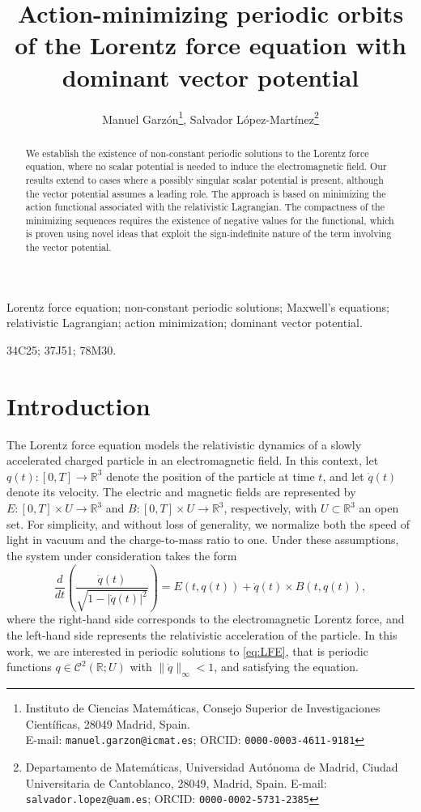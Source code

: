 \documentclass{article}
\title{Action-minimizing periodic orbits of the Lorentz force equation with dominant vector potential}
\author{ Manuel Garz\'on\footnote{Instituto de Ciencias Matemáticas, Consejo Superior de Investigaciones Científicas, 28049 Madrid, Spain. \\E-mail: {\tt manuel.garzon@icmat.es}; ORCID: {\tt 0000-0003-4611-9181}}, Salvador L\'opez-Mart\'inez\footnote{Departamento de Matem\'aticas, Universidad Aut\'onoma de Madrid, Ciudad Universitaria de Cantoblanco, 28049, Madrid, Spain. 
		E-mail: {\tt salvador.lopez@uam.es}; ORCID: {\tt 0000-0002-5731-2385}}}
\newcommand{\boC}{\mathcal{C}}
\newcommand{\R}{\mathbb{R}}
\newcommand{\dq}{\dot{q}}
\theoremstyle{definition}
\begin{document}
\maketitle

\medskip
	
\begin{abstract}
We establish the existence of non-constant periodic solutions to the Lorentz force equation, where no scalar potential is needed to induce the electromagnetic field. Our results extend to cases where a possibly singular scalar potential is present, although the vector potential assumes a leading role. The approach is based on minimizing the action functional associated with the relativistic Lagrangian. The compactness of the minimizing sequences requires the existence of negative values for the functional, which is proven using novel ideas that exploit the sign-indefinite nature of the term involving the vector potential.
\end{abstract}


		Lorentz force equation; non-constant periodic solutions; Maxwell's equations; relativistic Lagrangian; action minimization; dominant vector potential.
		
		\medskip
        34C25; 37J51; 78M30.



\section{Introduction}
The Lorentz force equation models the relativistic dynamics of a slowly accelerated charged particle in an electromagnetic field. In this context, let $q(t):[0,T]\rightarrow\R^3$ denote the position of the particle at time $t$, and let $\dq(t)$ denote its velocity. The electric and magnetic fields are represented by $E:[0,T]\times U\rightarrow\R^3$ and $B:[0,T]\times U\rightarrow\R^3$, respectively, with $U\subset\R^3$ an open set. For simplicity, and without loss of generality, we normalize both the speed of light in vacuum and the charge-to-mass ratio to one. Under these assumptions, the system under consideration takes the form
\begin{equation}\label{eq:LFE}
    \dfrac{d}{dt}\left(\frac{\dq(t)}{\sqrt{1-|\dq(t)|^2}}\right)=E(t,q(t)) + \dq(t)\times B(t,q(t)),
\end{equation}
where the right-hand side corresponds to the electromagnetic Lorentz force, and the left-hand side represents the relativistic acceleration of the particle. In this work, we are interested in periodic solutions to \eqref{eq:LFE}, that is periodic functions $q\in\boC^2(\R;U)$ with $\|\dq\|_\infty<1$, and satisfying the equation.
\end{document}
